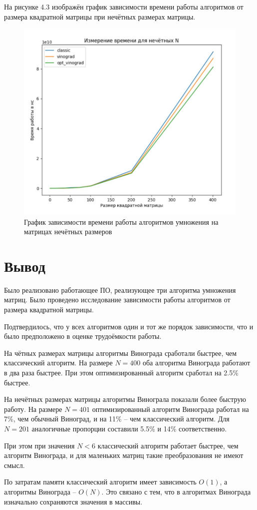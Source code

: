 На рисунке 4.3 изображён график зависимости времени работы алгоритмов от размера 
квадратной матрицы при нечётных размерах матрицы.

\FloatBarrier
\begin{figure}[h]
	\begin{center}
		\includegraphics[width=\linewidth]{inc/nechet.jpg}
	\end{center}
	\caption{График зависимости времени работы алгоритмов умножения на матрицах нечётных размеров}
\end{figure}
\FloatBarrier

\section{Вывод}
Было реализовано работающее ПО, реализующее три алгоритма умножения матриц.
Было проведено исследование зависимости работы алгоритмов от размера квадратной матрицы.

Подтвердилось, что у всех алгоритмов один и тот же порядок зависимости, 
что и было предположено в оценке трудоёмкости работы.

На чётных размерах матрицы алгоритмы Винограда сработали быстрее, чем классический алгоритм.
На размере $N=400$ оба алгоритма Винограда работают в два раза быстрее. При этом оптимизированный
алгоритм сработал на 2.5\% быстрее.

На нечётных размерах матрицы алгоритмы Винограла показали более быструю работу.
На размере $N=401$ оптимизированный алгоритм Винограда работал на 7\%, чем обычный Виноград, 
и на 11\% -- чем классический алгоритм. Для $N=201$ аналогичные пропорции составили 
5.5\% и 14\% соответственно.

При этом при значения $N<6$ классический алгоритм работает быстрее, чем алгоритм Винограда,
и для маленьких матриц такие преобразования не имеют смысл.

По затратам памяти классический алгоритм имеет зависимость $O(1)$, а алгоритмы Винограда -- $O(N)$.
Это связано с тем, что в алгоритмах Винограда изначально сохраняются значения в массивы. 
